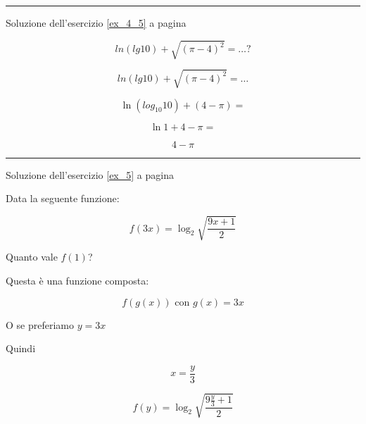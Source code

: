 \vspace{1cm}
\hrule
\vspace{1cm}

Soluzione dell'esercizio \ref{ex_4_5} a pagina \pageref{ex_4_5}\label{sol_4_5}

\begin{equation*} %
ln(lg 10)+ \sqrt{(\pi -4)^2}=\ldots?
\end{equation*}


\begin{equation*}
ln(lg 10)+ \sqrt{(\pi -4)^2}=\ldots
\end{equation*}

\begin{equation*}
\ln(log_{10} 10) +(4-\pi)=
\end{equation*}

\begin{equation*}
\ln1+4-\pi=
\end{equation*}

\begin{equation*}
4-\pi
\end{equation*}





\vspace{1cm}
\hrule
\vspace{1cm}






Soluzione dell'esercizio \ref{ex_5} a pagina \pageref{ex_5}\label{sol_5}

Data la seguente funzione:

\begin{equation*}
f(3x)=\log_2{\sqrt{\frac{9x+1}{2}}}
\end{equation*}

Quanto vale $f(1)$?


Questa è una funzione composta:

\begin{equation*}
f(g(x)) \textrm{ con } g(x)=3x
\end{equation*}

O se preferiamo $y=3x$

Quindi 

\begin{equation*}
x=\frac{y}{3}
\end{equation*}

\begin{equation*}
f(y)=\log_2{\sqrt{\frac{9\frac{y}{3}+1}{2}}}
\end{equation*}

